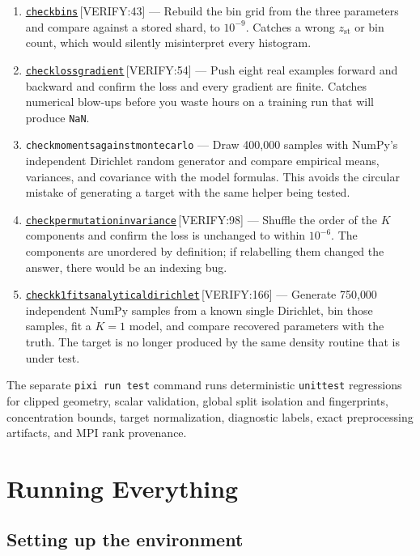 \documentclass[11pt,a4paper]{report}
\newcommand{\srcbase}{vscode://file/Users/syellapa/Documents/Research/2026/ANSYS/Multi-ScalarPDF}
\newcommand{\dmdn}{dirichlet\string_mdn}
\newcommand{\srctag}[1]{{\footnotesize\textcolor{TagGray}{[#1]}}}
\newcommand{\Verify}[2]{\href{\srcbase/\dmdn/verify.py:#1}{\texttt{#2}}\,\srctag{VERIFY:#1}}
\newcommand{\code}[1]{\texttt{#1}}
\renewcommand{\_}{\origtextunderscore\allowbreak}
\begin{document}
\begin{enumerate}
  \item \Verify{43}{check\_bins} --- Rebuild the bin grid from the three parameters and compare
        against a stored shard, to $10^{-9}$. Catches a wrong $z_{\text{st}}$ or bin count,
        which would silently misinterpret every histogram.
  \item \Verify{54}{check\_loss\_gradient} --- Push eight real examples forward and backward and
        confirm the loss and every gradient are finite. Catches numerical blow-ups before you
        waste hours on a training run that will produce \code{NaN}.
  \item \code{check\_moments\_against\_monte\_carlo} --- Draw 400{,}000 samples with
        NumPy's independent Dirichlet random generator and compare empirical means, variances,
        and covariance with the model formulas. This avoids the circular mistake of generating
        a target with the same helper being tested.
  \item \Verify{98}{check\_permutation\_invariance} --- Shuffle the order of the $K$ components
        and confirm the loss is unchanged to within $10^{-6}$. The components are unordered by
        definition; if relabelling them changed the answer, there would be an indexing bug.
  \item \Verify{166}{check\_k1\_fits\_analytical\_dirichlet} --- Generate 750{,}000 independent
        NumPy samples from a known single Dirichlet, bin those samples, fit a $K=1$ model, and
        compare recovered parameters with the truth. The target is no longer produced by the
        same density routine that is under test.
\end{enumerate}

The separate \code{pixi run test} command runs deterministic \code{unittest} regressions for
clipped geometry, scalar validation, global split isolation and fingerprints, concentration
bounds, target normalization, diagnostic labels, exact preprocessing artifacts, and MPI rank
provenance.

\chapter{Running Everything}

\section{Setting up the environment}
\end{document}
